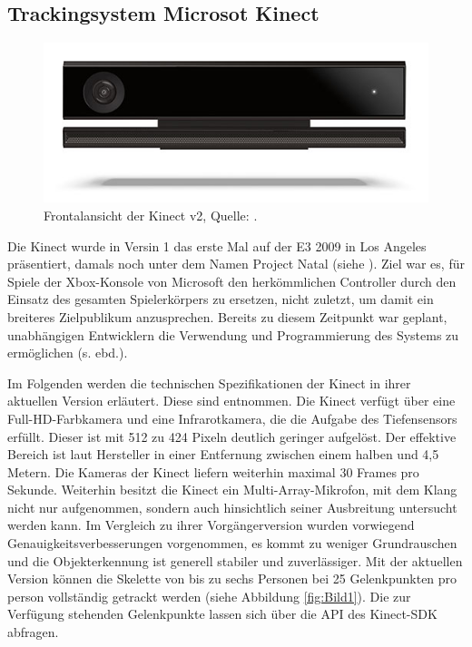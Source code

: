 \subsection{Trackingsystem Microsot Kinect}\label{sec:kinect}
\vspace*{-.8cm}
\begin{figure}[H]
\centering
\includegraphics[width=.9\textwidth]{pictures/kinectimg.jpg}
\vspace*{-.5cm}
\caption{Frontalansicht der Kinect v2, Quelle: \cite{kinectimg}.}
\end{figure}
Die Kinect wurde in Versin 1 das erste Mal auf der E3 2009 in Los Angeles präsentiert, damals noch unter dem Namen \glqq{}Project Natal\grqq{} (siehe \cite{latimes}). Ziel war es, für Spiele der Xbox-Konsole von Microsoft den herkömmlichen Controller durch den Einsatz des gesamten Spielerkörpers zu ersetzen, nicht zuletzt, um damit ein breiteres Zielpublikum anzusprechen. Bereits zu diesem Zeitpunkt war geplant, unabhängigen Entwicklern die Verwendung und Programmierung des Systems zu ermöglichen (s. ebd.).\par 
Im Folgenden werden die technischen Spezifikationen der Kinect in ihrer aktuellen Version erläutert. Diese sind \cite{specs} entnommen. Die Kinect verfügt über eine Full-HD-Farbkamera und eine Infrarotkamera, die die Aufgabe des Tiefensensors erfüllt. Dieser ist mit 512 zu 424 Pixeln deutlich geringer aufgelöst. Der effektive Bereich ist laut Hersteller in einer Entfernung zwischen einem halben und 4,5 Metern. Die Kameras der Kinect liefern weiterhin maximal 30 Frames pro Sekunde. Weiterhin besitzt die Kinect ein Multi-Array-Mikrofon, mit dem Klang nicht nur aufgenommen, sondern auch hinsichtlich seiner Ausbreitung untersucht werden kann. Im Vergleich zu ihrer Vorgängerversion wurden vorwiegend Genauigkeitsverbesserungen vorgenommen, es kommt zu weniger Grundrauschen und die Objekterkennung ist generell stabiler und zuverlässiger. Mit der aktuellen Version können die Skelette von bis zu sechs Personen bei 25 Gelenkpunkten pro person vollständig getrackt werden (siehe Abbildung \ref{fig:Bild1}). Die zur Verfügung stehenden Gelenkpunkte lassen sich über die API des Kinect-SDK abfragen.
